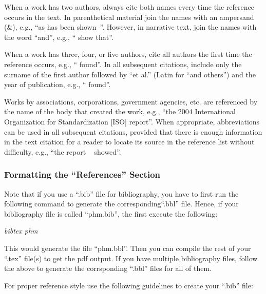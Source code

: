 \documentclass[IJPHM, 2014, 00]{PHMSociety}
\begin{document}
When a work has two authors, always cite both names every time the reference occurs in the text. In parenthetical material join the names with an ampersand (\&), e.g., ``as has been shown~\cite{Schwabacher}''. However, in narrative text, join the names with the word ``and'', e.g., ``\cite{Schwabacher} show that''. 

When a work has three, four, or five authors, cite all authors the first time the reference occurs, e.g., ``\cite{vachtsevanos} found''. In all subsequent citations, include only the surname of the first author followed by ``et al.'' (Latin for ``and others'') and the year of publication, e.g., `` found''. 

Works by associations, corporations, government agencies, etc. are referenced by the name of the body that created the work, e.g., ``the 2004 International Organization for Standardization [ISO] report''. When appropriate, abbreviations can be used in all subsequent citations, provided that there is enough information in the text citation for a reader to locate its source in the reference list without difficulty, e.g., ``the report ~\cite{iso} showed''.





\subsubsection{Formatting the ``References'' Section}

Note that if you use a ``.bib'' file for bibliography, you have to first run the following command to generate the corresponding``.bbl'' file. Hence, if your bibliography file is called ``phm.bib'', the first execute the following:

\textit{bibtex phm} 

This would generate the file ``phm.bbl''. Then you can compile the rest of your ``.tex'' file(s) to get the pdf output. If you have multiple bibliography files, follow the above to generate the corrsponding ``.bbl'' files for all of them. 

For proper reference style use the following guidelines to create your ``.bib'' file:
\end{document}
